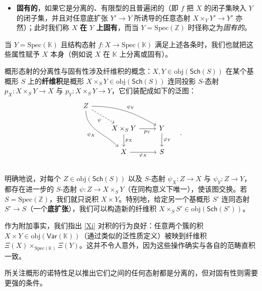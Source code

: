 \begin{Def}
\begin{itemize}[leftmargin=0.5cm]
	\item \textbf{固有的}，如果它是分离的、有限型的且普遍闭的（即 $f$ 把 $X$ 的闭子集映入 $Y$ 的闭子集，并且对任意底扩张 $Y'\rightarrow Y$ 所诱导的任意态射 $X\times_Y Y'\rightarrow Y'$ 亦然）；此时我们称 $X$ \textbf{在 $Y$ 上固有}，而当 $Y=\text{Spec}(\mathbb{Z})$ 时径称之为\textit{固有的}。
\end{itemize}
当 $Y=\text{Spec}(\mathbb{K})$ 且结构态射 $f:X\rightarrow\text{Spec}(\mathbb{K})$ 满足上述各条时，我们也就把这些属性赋予 $X$ 本身（例如说 $X$ 在 $\mathbb{K}$ 上分离或固有）。
\end{Def}

\begin{Rem}\label{varschproductremark}
概形态射的分离性与固有性涉及纤维积的概念：$X,Y\in\text{obj}(\mathsf{Sch}(S))$ 在某个基概形 $S$ 上的\textbf{纤维积}是概形 $X\times_S Y\in\text{obj}(\mathsf{Sch}(S))$ 连同投影 $S$-态射 $p_X:X\times_S Y\rightarrow X$ 与 $p_Y:X\times_S Y\rightarrow Y$，它们装配成如下的泛图：
\begin{equation}\label{varschproduct}
	\begin{tikzcd}
		Z\arrow[dr, dashed, "\psi"']\arrow[ddr, out=270, in=135, "\psi_X"']\arrow[drr, out=0, in=150, "\psi_Y"] & &\\
		& X\times_S Y\arrow[d, "p_X"]\arrow[r, "p_Y"'] & Y\arrow[d, "\varphi_Y"] \\
		& X\arrow[r, "\varphi_X"'] & S \\
	\end{tikzcd}\quad.\vspace*{-0.3cm}
\end{equation}
明确地说，对每个 $Z\in\text{obj}(\mathsf{Sch}(S))$ 以及 $S$-态射 $\psi_X:Z\rightarrow X$ 与 $\psi_Y:Z\rightarrow Y$，都存在进一步的 $S$-态射 $\psi:Z\rightarrow X\times_S Y$（在同构意义下唯一），使该图交换。若 $S=\text{Spec}(\mathbb{Z})$，我们就只说积 $X\times Y$。特别地，给定另一个基概形 $S'$ 连同态射 $S'\rightarrow S$（一个\textbf{底扩张}），我们可以构造新的纤维积 $X\times_S S'\in\text{obj}(\mathsf{Sch}(S'))$。

作为附加事实，我们指出 \eqref{Xi} 对积的行为良好：任意两个簇的积 $X\times Y\in\text{obj}(\mathsf{Var(\mathbb{K})})$（通过类似的泛性质定义）被映到纤维积 $\Xi(X)\times_{\text{Spec}(\mathbb{K})} \Xi(Y)$。这并不令人意外，因为这些操作确实与各自的范畴直积一致。 
\end{Rem}

所关注概形的诺特性足以推出它们之间的任何态射都是分离的，但对固有性则需要更强的条件。

